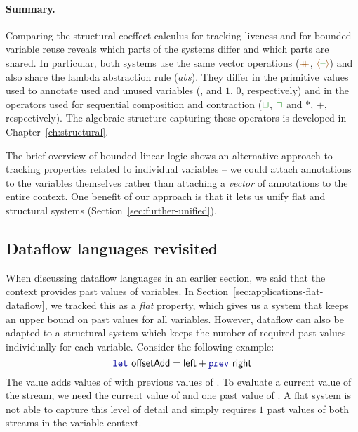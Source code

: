 \paragraph{Summary.}
Comparing the structural coeffect calculus for tracking liveness and for bounded variable reuse
reveals which parts of the systems differ and which parts are shared. In particular, both systems
use the same vector operations ($\atimes$, $\alift{\cclrd{\textnormal{--}}}$) and also share the
lambda abstraction rule (\emph{abs}). They differ in the primitive values used to annotate used
and unused variables (,  and $1$, $0$, respectively) and in the operators used
for sequential composition and contraction ($\cclrd{\sqcup}$, $\cclrd{\sqcap}$ and $\ast$, $+$, respectively).
The algebraic structure capturing these operators is developed in Chapter~\ref{ch:structural}.

The brief overview of bounded linear logic shows an alternative approach to tracking properties
related to individual variables -- we could attach annotations to the variables themselves
rather than attaching a \emph{vector} of annotations to the entire context. One benefit
of our approach is that it lets us unify flat and structural systems (Section~\ref{sec:further-unified}).


\subsection{Dataflow languages revisited}
\label{sec:applications-structural-dataflow}

When discussing dataflow languages in an earlier section, we said that the context provides
past values of variables. In Section~\ref{sec:applications-flat-dataflow}, we tracked this as
a \emph{flat} property, which gives us a system that keeps an upper bound on past values for
all variables. However, dataflow can also be adapted to a structural system which keeps the number
of required past values individually for each variable. Consider the
following example:
%
\begin{equation*}
\kvd{let}~\ident{offsetAdd} = \ident{left} + \kvd{prev}~\ident{right}
\end{equation*}
%
The value  adds values of  with previous values of .
To evaluate a current value of the stream, we need the current value of  and one past
value of . A flat system is not able to capture this level of detail and simply
requires $1$ past values of both streams in the variable context.

